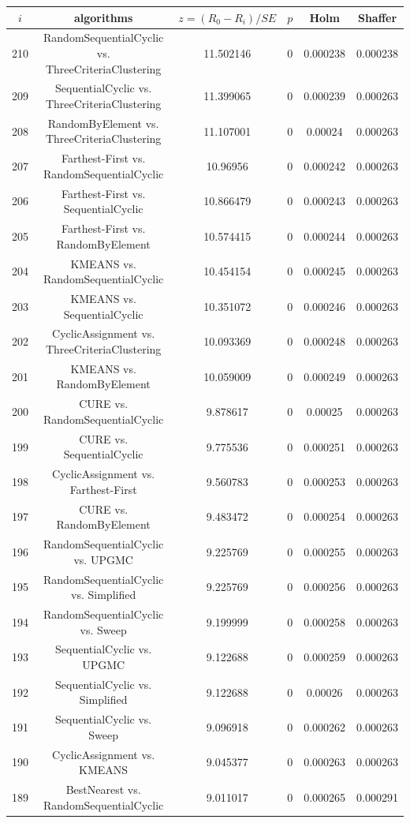 \documentclass[a4paper,10pt]{article}
\begin{document}
\begin{landscape}
\begin{table}[!htp]
\centering\scriptsize
\begin{tabular}{cccccc}
$i$&algorithms&$z=(R_0 - R_i)/SE$&$p$&Holm&Shaffer\\
\hline210&RandomSequentialCyclic vs. ThreeCriteriaClustering&11.502146&0&0.000238&0.000238\\
209&SequentialCyclic vs. ThreeCriteriaClustering&11.399065&0&0.000239&0.000263\\
208&RandomByElement vs. ThreeCriteriaClustering&11.107001&0&0.00024&0.000263\\
207&Farthest-First vs. RandomSequentialCyclic&10.96956&0&0.000242&0.000263\\
206&Farthest-First vs. SequentialCyclic&10.866479&0&0.000243&0.000263\\
205&Farthest-First vs. RandomByElement&10.574415&0&0.000244&0.000263\\
204&KMEANS vs. RandomSequentialCyclic&10.454154&0&0.000245&0.000263\\
203&KMEANS vs. SequentialCyclic&10.351072&0&0.000246&0.000263\\
202&CyclicAssignment vs. ThreeCriteriaClustering&10.093369&0&0.000248&0.000263\\
201&KMEANS vs. RandomByElement&10.059009&0&0.000249&0.000263\\
200&CURE vs. RandomSequentialCyclic&9.878617&0&0.00025&0.000263\\
199&CURE vs. SequentialCyclic&9.775536&0&0.000251&0.000263\\
198&CyclicAssignment vs. Farthest-First&9.560783&0&0.000253&0.000263\\
197&CURE vs. RandomByElement&9.483472&0&0.000254&0.000263\\
196&RandomSequentialCyclic vs. UPGMC&9.225769&0&0.000255&0.000263\\
195&RandomSequentialCyclic vs. Simplified&9.225769&0&0.000256&0.000263\\
194&RandomSequentialCyclic vs. Sweep&9.199999&0&0.000258&0.000263\\
193&SequentialCyclic vs. UPGMC&9.122688&0&0.000259&0.000263\\
192&SequentialCyclic vs. Simplified&9.122688&0&0.00026&0.000263\\
191&SequentialCyclic vs. Sweep&9.096918&0&0.000262&0.000263\\
190&CyclicAssignment vs. KMEANS&9.045377&0&0.000263&0.000263\\
189&BestNearest vs. RandomSequentialCyclic&9.011017&0&0.000265&0.000291\\

\end{tabular}
\end{table}
\end{landscape}
\end{document}
